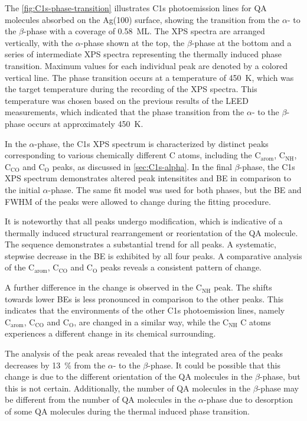 The \autoref{fig:C1s-phase-transition} illustrates C1s photoemission lines for \ac{QA} molecules absorbed on the Ag(100) surface, showing the transition from the $\alpha$- to the $\beta$-phase with a coverage of 0.58~\ac{ML}. The \ac{XPS} spectra are arranged vertically, with the $\alpha$-phase shown at the top, the $\beta$-phase at the bottom and a series of intermediate \ac{XPS} spectra representing the thermally induced phase transition. Maximum values for each individual peak are denoted by a colored vertical line. The phase transition occurs at a temperature of 450~\si{K}, which was the target temperature during the recording of the \ac{XPS} spectra. This temperature was chosen based on the previous results of the \ac{LEED} measurements, which indicated that the phase transition from the $\alpha$- to the $\beta$-phase occurs at approximately 450~\si{K}.

In the $\alpha$-phase, the C1s \ac{XPS} spectrum is characterized by distinct peaks corresponding to various chemically different C atoms, including the $\mathrm{C_{arom}}$, $\mathrm{C_{NH}}$, $\mathrm{C_{CO}}$ and $\mathrm{C_{O}}$ peaks, as discussed in \autoref{sec:C1s-alpha}. In the final $\beta$-phase, the C1s \ac{XPS} spectrum demonstrates altered peak intensitites and \ac{BE} in comparison to the initial $\alpha$-phase. The same fit model was used for both phases, but the \ac{BE} and \ac{FWHM} of the peaks were allowed to change during the fitting procedure.

It is noteworthy that all peaks undergo modification, which is indicative of a thermally induced structural rearrangement or reorientation of the \ac{QA} molecule. The sequence demonstrates a substantial trend for all peaks. A systematic, stepwise decrease in the \ac{BE} is exhibited by all four peaks. A comparative analysis of the $\mathrm{C_{arom}}$, $\mathrm{C_{CO}}$ and $\mathrm{C_{O}}$ peaks reveals a consistent pattern of change.

A further difference in the change is observed in the $\mathrm{C_{NH}}$ peak. The shifts towards lower \acp{BE} is less pronounced in comparison to the other peaks. This indicates that the environments of the other C1s photoemission lines, namely $\mathrm{C_{arom}}$, $\mathrm{C_{CO}}$ and $\mathrm{C_{O}}$, are changed in a similar way, while the $\mathrm{C_{NH}}$ C atoms experiences a different change in its chemical surrounding.

The analysis of the peak areas revealed that the integrated area of the peaks decreases by 13~\% from the $\alpha$- to the $\beta$-phase. It could be possible that this change is due to the different orientation of the \ac{QA} molecules in the $\beta$-phase, but this is not certain. Additionally, the number of \ac{QA} molecules in the $\beta$-phase may be different from the number of \ac{QA} molecules in the $\alpha$-phase due to desorption of some \ac{QA} molecules during the thermal induced phase transition.

